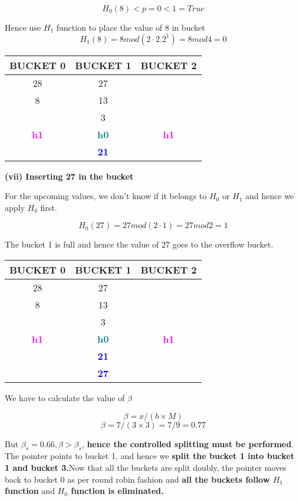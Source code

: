 \[H_0(8) < p = 0 < 1 = True\]

Hence use $H_1$ function to place the value of 8 in bucket
\[H_1(8) = 8 mod (2 \cdot 2.2^1)  = 8 mod 4 = 0\]


\begin{center}
\begin{tabular}{ |c|c|c| } 
 \hline
 BUCKET 0 & \textbf{\color{red}{P}} BUCKET 1 & BUCKET 2\\ [0.5ex] 
 \hline\hline
 \hline
  28 & 27 & \\ 
   8 & 13 & \\
   & 3 & \\
 \hline
 \hline
\textbf{\textcolor{magenta}{h1}} & \textbf{\textcolor{teal}{h0}}& \textbf{\textcolor{magenta}{h1}}\\ [0.5ex] 
 \hline
     & \textbf{\textcolor{blue}{21}}
\end{tabular}
\end{center}
\textbf{(vii) Inserting 27 in the bucket}

For the upcoming values, we don't know if it belongs to $H_0$ or $H_1$ and hence we apply ${H_0}$ first.

\[H_0(27) = 27 mod (2 \cdot 1)  = 27 mod 2 = 1\] 

The bucket 1 is full and hence the value of 27 goes to the overflow bucket.

\begin{center}
\begin{tabular}{ |c|c|c| } 
 \hline
 BUCKET 0 & \textbf{\color{red}{P}} BUCKET 1 & BUCKET 2\\ [0.5ex] 
 \hline\hline
 \hline
  28 & 27 & \\ 
   8 & 13 & \\
   & 3 & \\
 \hline
 \hline
\textbf{\textcolor{magenta}{h1}} & \textbf{\textcolor{teal}{h0}}& \textbf{\textcolor{magenta}{h1}}\\ [0.5ex] 
 \hline
     & \textbf{\textcolor{blue}{21}}\\ 
     & \textbf{\textcolor{blue}{27}}
\end{tabular}
\end{center}

We have to calculate the value of $\beta$

\[\beta = x/(b \times M)\]
\[\beta = 7/(3 \times 3) = 7/9 = 0.77\]

But $\beta_s = 0.66 , \beta>\beta_s$,\textbf{ hence the controlled splitting must be performed}. The pointer points to bucket 1, and hence we \textbf{split the bucket 1 into bucket 1 and bucket 3.}Now that all the buckets are split doubly, the pointer moves back to bucket 0 as per round robin fashion and \textbf{all the buckets follow $H_1$ function} and \textbf{$H_0$ function is eliminated.}


